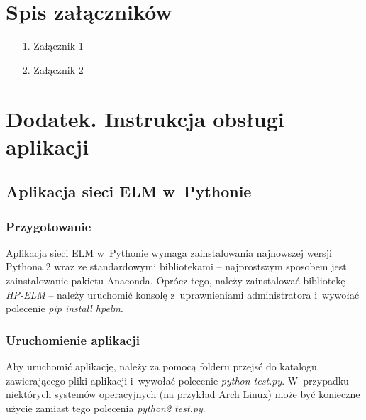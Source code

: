 \documentclass[pl]{minipw} %
\begin{document}
\chapter*{Spis załączników}
\begin{enumerate}
\item[1.] Załącznik 1
\item[2.] Załącznik 2
\end{enumerate}

\chapter*{Dodatek. Instrukcja obsługi aplikacji}
\section*{Aplikacja sieci ELM w~Pythonie}
\subsection*{Przygotowanie}
Aplikacja sieci ELM w~Pythonie wymaga zainstalowania najnowszej wersji Pythona 2 wraz ze standardowymi bibliotekami -- najprostszym sposobem jest zainstalowanie pakietu Anaconda. Oprócz tego, należy zainstalować bibliotekę \textit{HP-ELM} -- należy uruchomić konsolę z~uprawnieniami administratora i~wywołać polecenie \textit{pip install hpelm}. 
\subsection*{Uruchomienie aplikacji}
Aby uruchomić aplikację, należy za pomocą folderu przejsć do katalogu zawierającego pliki aplikacji i~wywołać polecenie \textit{python test.py}. W~przypadku niektórych systemów operacyjnych (na przykład Arch Linux) może być konieczne użycie zamiast tego polecenia \textit{python2 test.py}.
\end{document}
